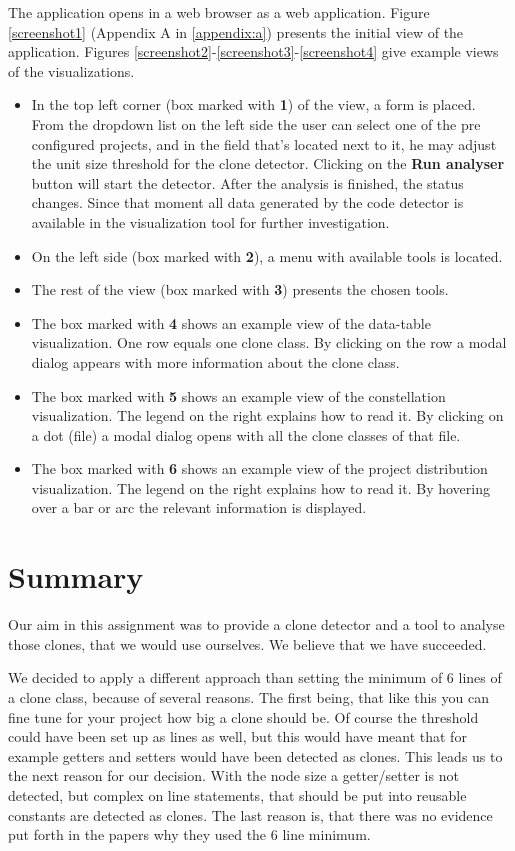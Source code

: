 \documentclass{uva-inf-article}
\begin{document}
The application opens in a web browser as a web application. Figure \ref{screenshot1} (Appendix A in \ref{appendix:a}) presents the initial view of the application. Figures \ref{screenshot2}-\ref{screenshot3}-\ref{screenshot4} give example views of the visualizations.

\begin{itemize}

\item{In the top left corner (box marked with \textbf{1}) of the view, a form is placed. From the dropdown list on the left side the user can select one of the pre configured projects, and in the field that's located next to it, he may adjust the unit size threshold for the clone detector. Clicking on the \textbf{Run analyser} button will start the detector. After the analysis is finished, the status changes. Since that moment all data generated by the code detector is available in the visualization tool for further investigation. }

\item{On the left side (box marked with \textbf{2}), a menu with available tools is located. }
\item{The rest of the view (box marked with \textbf{3}) presents the chosen tools. }
\item{The box marked with \textbf{4} shows an example view of the data-table visualization. One row equals one clone class. By clicking on the row a modal dialog appears with more information about the clone class.}
\item{The box marked with \textbf{5} shows an example view of the constellation visualization. The legend on the right explains how to read it. By clicking on a dot (file) a modal dialog opens with all the clone classes of that file. }
\item{The box marked with \textbf{6} shows an example view of the project distribution visualization. The legend on the right explains how to read it. By hovering over a bar or arc the relevant information is displayed.}
\end{itemize}

\section{Summary}
Our aim in this assignment was to provide a clone detector and a tool to analyse those clones, that we would use ourselves. We believe that we have succeeded. 

We decided to apply a different approach than setting the minimum of 6 lines of a clone class, because of several reasons. The first being, that like this you can fine tune for your project how big a clone should be. Of course the threshold could have been set up as lines as well, but this would have meant that for example getters and setters would have been detected as clones. This leads us to the next reason for our decision. With the node size a getter/setter is not detected, but complex on line statements, that should be put into reusable constants are detected as clones. The last reason is, that there was no evidence put forth in the papers why they used the 6 line minimum.
\end{document}
